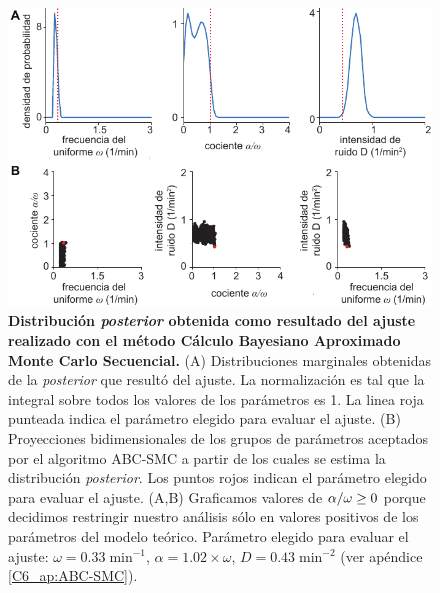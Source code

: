 \documentclass[./main.tex]{subfiles}
\begin{document}
\begin{figure}
    \centering
    \includegraphics[width=1\columnwidth]{figures/chapter6/C6_fit_refval.pdf} 
    \caption{\textbf{Distribución \textit{posterior} obtenida como resultado del ajuste realizado con el método Cálculo Bayesiano Aproximado Monte Carlo Secuencial.} (A) Distribuciones marginales obtenidas de la \textit{posterior} que resultó del ajuste. La normalización es tal que la integral sobre todos los valores de los parámetros es 1. La linea roja punteada indica el parámetro elegido para evaluar el ajuste. (B) Proyecciones bidimensionales de los grupos de parámetros aceptados por el algoritmo ABC-SMC a partir de los cuales se estima la distribución \textit{posterior}. Los puntos rojos indican el parámetro elegido para evaluar el ajuste. (A,B) Graficamos valores de $\alpha/\omega \geq 0$ porque decidimos restringir nuestro análisis sólo en valores positivos de los parámetros del modelo teórico. Parámetro elegido para evaluar el ajuste: $\omega = 0.33 \;\text{min}^{-1}$, $\alpha = 1.02 \times \omega$, $ D = 0.43 \; \text{min}^{-2}$ (ver apéndice \ref{C6_ap:ABC-SMC}).}
    \label{C6_fig:fit}
\end{figure} 
\end{document}
